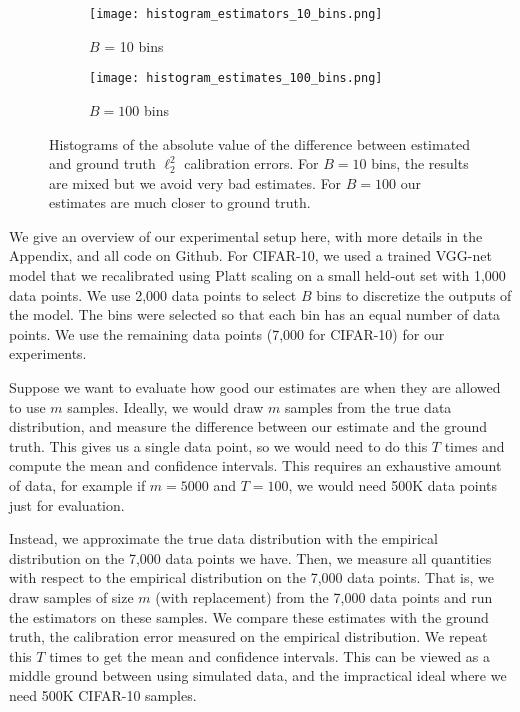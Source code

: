 \begin{figure}
  \centering
  \centering
     \begin{subfigure}[b]{0.45\textwidth}
         \centering
         \texttt{[image: histogram\_estimators\_10\_bins.png]}
         \caption{$B$ = 10 bins}
     \end{subfigure}
     \hfill
     \begin{subfigure}[b]{0.45\textwidth}
         \centering
         \texttt{[image: histogram\_estimates\_100\_bins.png]}
         \caption{$B = 100$ bins}
     \end{subfigure}
  \caption{Histograms of the absolute value of the difference between estimated and ground truth $\ell_2^2$ calibration errors. For $B = 10$ bins, the results are mixed but we avoid very bad estimates. For $B=100$ our estimates are much closer to ground truth.}
  \label{fig:histograms_estimators_bins}
\end{figure}


We give an overview of our experimental setup here, with more details in the Appendix, and all code on Github. For CIFAR-10, we used a trained VGG-net model that we recalibrated using Platt scaling on a small held-out set with 1,000 data points. We use 2,000 data points to select $B$ bins to discretize the outputs of the model. The bins were selected so that each bin has an equal number of data points. We use the remaining data points (7,000 for CIFAR-10) for our experiments. 

Suppose we want to evaluate how good our estimates are when they are allowed to use $m$ samples. Ideally, we would draw $m$ samples from the true data distribution, and measure the difference between our estimate and the ground truth. This gives us a single data point, so we would need to do this $T$ times and compute the mean and confidence intervals. This requires an exhaustive amount of data, for example if $m = 5000$ and $T = 100$, we would need 500K data points just for evaluation.

Instead, we approximate the true data distribution with the empirical distribution on the 7,000 data points we have. Then, we measure all quantities with respect to the empirical distribution on the 7,000 data points. That is, we draw samples of size $m$ (with replacement) from the 7,000 data points and run the estimators on these samples. We compare these estimates with the ground truth, the calibration error measured on the empirical distribution. We repeat this $T$ times to get the mean and confidence intervals. This can be viewed as a middle ground between using simulated data, and the impractical ideal where we need 500K CIFAR-10 samples.


